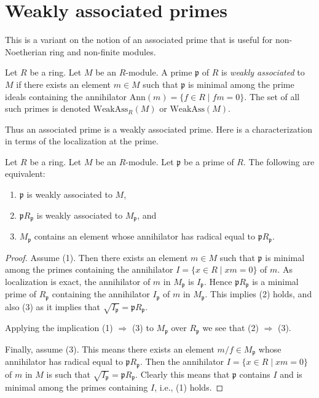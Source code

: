 \section{Weakly associated primes}
\label{section-weakly-ass}

\noindent
This is a variant on the notion of an associated prime that is useful
for non-Noetherian ring and non-finite modules.

\begin{definition}
\label{definition-weakly-associated}
Let $R$ be a ring. Let $M$ be an $R$-module.
A prime $\mathfrak p$ of $R$ is {\it weakly associated} to $M$
if there exists an element $m \in M$ such that $\mathfrak p$ is minimal
among the prime ideals containing the annihilator
$\text{Ann}(m) = \{f \in R \mid fm = 0\}$.
The set of all such primes is denoted $\text{WeakAss}_R(M)$
or $\text{WeakAss}(M)$.
\end{definition}

\noindent
Thus an associated prime is a weakly associated prime.
Here is a characterization in terms of the localization at the prime.

\begin{lemma}
\label{lemma-weakly-ass-local}
Let $R$ be a ring. Let $M$ be an $R$-module.
Let $\mathfrak p$ be a prime of $R$.
The following are equivalent:
\begin{enumerate}
\item $\mathfrak p$ is weakly associated to $M$,
\item $\mathfrak pR_{\mathfrak p}$ is weakly associated to $M_{\mathfrak p}$,
and
\item $M_{\mathfrak p}$ contains an element whose
annihilator has radical equal to $\mathfrak pR_{\mathfrak p}$.
\end{enumerate}
\end{lemma}

\begin{proof}
Assume (1). Then there exists an element $m \in M$ such that
$\mathfrak p$ is minimal among the primes containing the annihilator
$I = \{x \in R \mid xm = 0\}$ of $m$. As localization is exact, the
annihilator of $m$ in $M_{\mathfrak p}$ is $I_{\mathfrak p}$.
Hence $\mathfrak pR_{\mathfrak p}$ is a minimal prime of
$R_{\mathfrak p}$ containing the annihilator $I_{\mathfrak p}$
of $m$ in $M_{\mathfrak p}$. This implies (2) holds, and also (3)
as it implies that $\sqrt{I_{\mathfrak p}} = \mathfrak pR_{\mathfrak p}$.

\medskip\noindent
Applying the implication (1) $\Rightarrow$ (3) to $M_{\mathfrak p}$
over $R_{\mathfrak p}$ we see that (2) $\Rightarrow$ (3).

\medskip\noindent
Finally, assume (3). This means there exists an element
$m/f \in M_{\mathfrak p}$ whose annihilator has radical equal
to $\mathfrak pR_{\mathfrak p}$. Then the annihilator
$I = \{x \in R \mid xm = 0\}$ of $m$ in $M$ is such that
$\sqrt{I_{\mathfrak p}} = \mathfrak pR_{\mathfrak p}$. Clearly
this means that $\mathfrak p$ contains $I$ and is minimal among the
primes containing $I$, i.e., (1) holds.
\end{proof}

